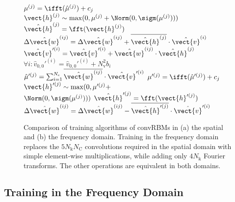 \begin{figure}[t!]
{\begin{minipage}{0.495\linewidth}
\begin{algorithm}[H]
{{    $\mu^{(j)} = \ifft(\hat{\mu}^{(j)}) + c_j$\;
    $\vect{h}^{(j)} \sim \max(0, \mu^{(j)} + \Norm(0, \sigm(\mu^{(j)})))$\;
    $\hat{\vect{h}}^{(j)} = \fft(\vect{h}^{(j)})$\;
     {
      $\Delta\hat{\vect{w}}^{(ij)} = \Delta\hat{\vect{w}}^{(ij)} +
      \overline{\hat{\vect{h}}^{(j)}} \cdot \hat{\vect{v}}^{(i)}$\;
      $\hat{\vect{v}}'^{(i)} = \hat{\vect{v}}'^{(i)} + \hat{\vect{w}}^{(ij)}
      \cdot \hat{\vect{h}}^{(j)}$\;
    }
  }
  $\forall i \colon \hat{v}_{0,0}'^{(i)} = \hat{v}_{0,0}'^{(i)} +
  N_\text{v}^2b_i$\;
   {
    $\hat{\mu}'^{(j)} = \sum_{i=1}^{N_\text{c}} \overline{\hat{\vect{w}}^{(ij)}}
    \cdot \hat{\vect{v}}'^{(i)}$\;
    $\mu'^{(j)} = \ifft(\hat{\mu}'^{(j)}) + c_j$\;
    $\vect{h}'^{(j)} \sim \max(0, \mu'^{(j)} +$ \\
    \hfill $\Norm(0,\sigm(\mu^{(j)})))$\;
    $\hat{\vect{h}}'^{(j)} = \fft(\vect{h}'^{(j)})$\;
     {
      $\Delta\hat{\vect{w}}^{(ij)} = \Delta\hat{\vect{w}}^{(ij)} -
      \overline{\hat{\vect{h}}'^{(j)}} \cdot \hat{\vect{v}}'^{(i)}$\;
    }
  }
}
\end{algorithm}
\end{minipage}
}
\caption[Comparison of training algorithms of convRBMs in the
spatial and frequency domain]{Comparison of training algorithms of convRBMs in
(a) the spatial and (b) the frequency domain. Training in the frequency domain replaces the $5N_\text{k}N_\text{C}$ convolutions required in the spatial domain with simple
element-wise multiplications, while adding only $4N_\text{k}$ Fourier
transforms. The other operations are equivalent in both domains.}
\label{fig:algorithms}
\end{figure}

\subsection{Training in the Frequency Domain}

